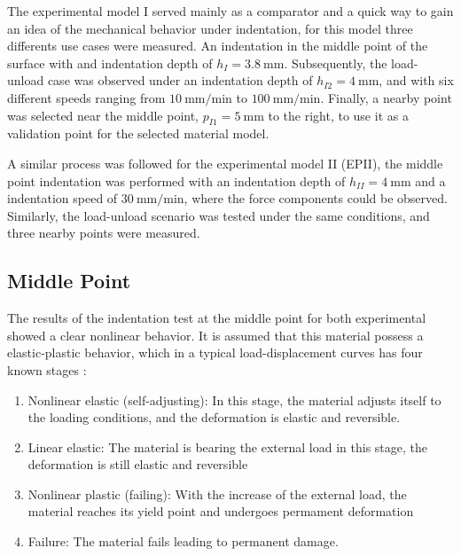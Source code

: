 The experimental model I served mainly as a comparator and a quick way to gain an idea of the 
mechanical behavior under indentation, for this model three differents use cases were measured. 
An indentation in the middle point of the surface with and indentation depth of $h_{I} = \SI{3.8}{\milli \m}$. 
Subsequently, the load-unload case was observed under an indentation depth of  $h_{I2} = \SI{4}{\milli \m}$, and 
with six different speeds ranging from $\SI[per-mode = symbol]{10}{\milli \m\per \minute}$ to 
$\SI[per-mode = symbol]{100}{\milli \m\per \minute}$. 
Finally, a nearby point was selected near the middle point, $p_{I1} = \SI{5}{\milli \m}$ to the right,
 to use it as a validation point for the selected material model. 

A similar process was followed for the experimental model II (EPII), the middle point indentation was 
performed with an indentation depth of $h_{II} = \SI{4}{\milli \m}$ and a indentation 
speed of $\SI[per-mode = symbol]{30}{\milli \m\per \minute}$, where the force components 
could be observed. Similarly, the load-unload scenario was tested under the same conditions, and three 
nearby points were measured.

\subsection{Middle Point}
\label{subsection:midpointresult}
The results of the indentation test at the middle point for both experimental showed a clear 
nonlinear behavior.  It is assumed that this material 
possess a elastic-plastic behavior, which in a typical load-displacement curves has four known stages \cite{Goharian2017}:

\begin{enumerate}
    \item Nonlinear elastic (self-adjusting): In this stage, the material adjusts itself to the loading conditions, and the deformation is elastic and reversible.
    \item Linear elastic: The material is bearing the external load in this stage, the deformation is still elastic and reversible 
    \item Nonlinear plastic (failing): With the increase of the external load, the material reaches its yield point and undergoes permament deformation
    \item Failure: The material fails leading to permanent damage.
\end{enumerate}


